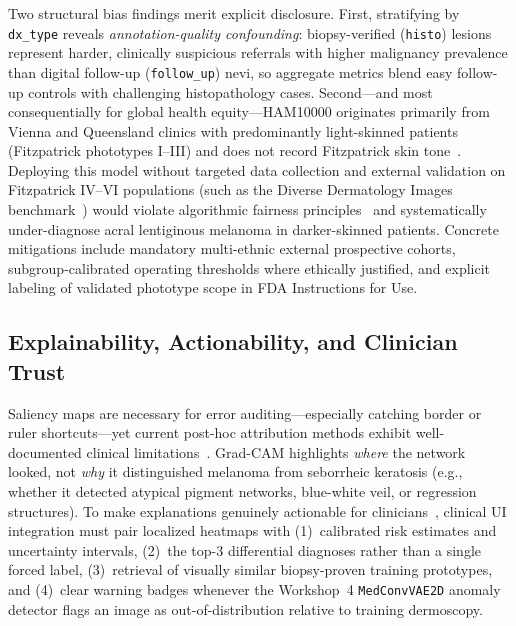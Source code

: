 Two structural bias findings merit explicit disclosure. First, stratifying by \texttt{dx\_type} reveals \emph{annotation-quality confounding}: biopsy-verified (\texttt{histo}) lesions represent harder, clinically suspicious referrals with higher malignancy prevalence than digital follow-up (\texttt{follow\_up}) nevi, so aggregate metrics blend easy follow-up controls with challenging histopathology cases. Second—and most consequentially for global health equity—HAM10000 originates primarily from Vienna and Queensland clinics with predominantly light-skinned patients (Fitzpatrick phototypes I--III) and does not record Fitzpatrick skin tone~\cite{Tschandl2018dataset,Daneshjou2022disparities}. Deploying this model without targeted data collection and external validation on Fitzpatrick IV--VI populations (such as the Diverse Dermatology Images benchmark~\cite{Daneshjou2022disparities}) would violate algorithmic fairness principles~\cite{Selbst2019fairness} and systematically under-diagnose acral lentiginous melanoma in darker-skinned patients. Concrete mitigations include mandatory multi-ethnic external prospective cohorts, subgroup-calibrated operating thresholds where ethically justified, and explicit labeling of validated phototype scope in FDA Instructions for Use.

\subsection{Explainability, Actionability, and Clinician Trust}
Saliency maps are necessary for error auditing—especially catching border or ruler shortcuts—yet current post-hoc attribution methods exhibit well-documented clinical limitations~\cite{Ghassemi2021false}. Grad-CAM highlights \emph{where} the network looked, not \emph{why} it distinguished melanoma from seborrheic keratosis (e.g., whether it detected atypical pigment networks, blue-white veil, or regression structures). To make explanations genuinely actionable for clinicians~\cite{Samek2021explaining,Caruana2015intelligible}, clinical UI integration must pair localized heatmaps with (1)~calibrated risk estimates and uncertainty intervals, (2)~the top-3 differential diagnoses rather than a single forced label, (3)~retrieval of visually similar biopsy-proven training prototypes, and (4)~clear warning badges whenever the Workshop~4 \texttt{MedConvVAE2D} anomaly detector flags an image as out-of-distribution relative to training dermoscopy.

